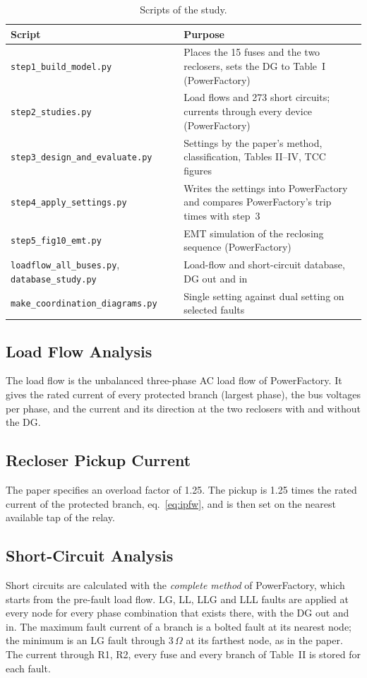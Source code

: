\documentclass[12pt,letterpaper]{article}
\newcommand{\hd}{\rowcolor{headc}}
\newcommand{\ohm}{\,\ensuremath{\Omega}}
\newcommand{\PF}{PowerFactory}
\begin{document}
\begin{table}[H]
\centering\small
\begin{tabularx}{\textwidth}{@{}lL@{}}
\toprule
\hd\textbf{Script} & \textbf{Purpose} \\
\midrule
\texttt{step1\_build\_model.py} & Places the 15 fuses and the two reclosers, sets the DG to Table~I (\PF) \\
\texttt{step2\_studies.py} & Load flows and 273 short circuits; currents through every device (\PF) \\
\texttt{step3\_design\_and\_evaluate.py} & Settings by the paper's method, classification, Tables II--IV, TCC figures \\
\texttt{step4\_apply\_settings.py} & Writes the settings into \PF{} and compares \PF's trip times with step~3 \\
\texttt{step5\_fig10\_emt.py} & EMT simulation of the reclosing sequence (\PF) \\
\texttt{loadflow\_all\_buses.py}, \texttt{database\_study.py} & Load-flow and short-circuit database, DG out and in \\
\texttt{make\_coordination\_diagrams.py} & Single setting against dual setting on selected faults \\
\bottomrule
\end{tabularx}
\caption{Scripts of the study.}
\label{tab:scripts}
\end{table}

\subsection{Load Flow Analysis}
The load flow is the unbalanced three-phase AC load flow of \PF. It gives the rated current of every
protected branch (largest phase), the bus voltages per phase, and the current and its direction at the two
reclosers with and without the DG.

\subsection{Recloser Pickup Current}
The paper specifies an overload factor of 1.25. The pickup is 1.25 times the rated current of the protected
branch, eq.~\eqref{eq:ipfw}, and is then set on the nearest available tap of the relay.

\subsection{Short-Circuit Analysis}
Short circuits are calculated with the \emph{complete method} of \PF, which starts from the pre-fault load
flow. LG, LL, LLG and LLL faults are applied at every node for every phase combination that exists there,
with the DG out and in. The maximum fault current of a branch is a bolted fault at its nearest node; the
minimum is an LG fault through 3\ohm{} at its farthest node, as in the paper. The current through R1, R2,
every fuse and every branch of Table~II is stored for each fault.
\end{document}
